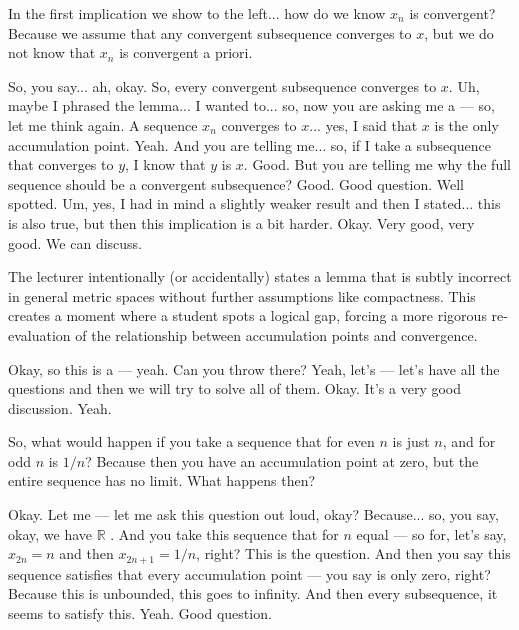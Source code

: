 \begin{student-question}
In the first implication we show to the left... how do we know $x_n$ is convergent? Because we assume that any convergent subsequence converges to $x$, but we do not know that $x_n$ is convergent a priori.
\end{student-question}

\begin{spoken-clean}[00:08:16 - 00:09:30]
So, you say... ah, okay. So, every convergent subsequence converges to $x$. Uh, maybe I phrased the lemma... I wanted to... so, now you are asking me a — so, let me think again. A sequence $x_n$ converges to $x$... yes, I said that $x$ is the only accumulation point. Yeah. And you are telling me... so, if I take a subsequence that converges to $y$, I know that $y$ is $x$. Good. But you are telling me why the full sequence should be a convergent subsequence? Good. Good question. Well spotted. Um, yes, I had in mind a slightly weaker result and then I stated... this is also true, but then this implication is a bit harder. Okay. Very good, very good. We can discuss.
\end{spoken-clean}

\begin{didactic-insight}
The lecturer intentionally (or accidentally) states a lemma that is subtly incorrect in general metric spaces without further assumptions like compactness. This creates a  moment where a student spots a logical gap, forcing a more rigorous re-evaluation of the relationship between accumulation points and convergence.
\end{didactic-insight}

\begin{spoken-clean}[00:09:31 - 00:11:23]
Okay, so this is a — yeah. Can you throw there? Yeah, let's — let's have all the questions and then we will try to solve all of them. Okay. It's a very good discussion. Yeah. 
\end{spoken-clean}

\begin{student-question}
So, what would happen if you take a sequence that for even $n$ is just $n$, and for odd $n$ is $1/n$? Because then you have an accumulation point at zero, but the entire sequence has no limit. What happens then?
\end{student-question}

\begin{spoken-clean}[continued]
 Okay. Let me — let me ask this question out loud, okay? Because... so, you say, okay, we have $\mathbb{R}$ . And you take this sequence that for $n$ equal — so for, let's say, $x_{2n} = n$ and then $x_{2n+1} = 1/n$, right? This is the question. And then you say this sequence satisfies that every accumulation point — you say is only zero, right? Because this is unbounded, this goes to infinity. And then every subsequence, it seems to satisfy this. Yeah. Good question.
\end{spoken-clean}


